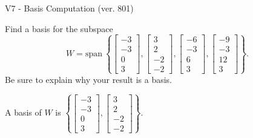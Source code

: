 \begin{exercise}
  \begin{exerciseTitle}V7 - Basis Computation (ver. 801)\end{exerciseTitle}
  \begin{exerciseStatement}
    Find a basis for the subspace 
\[W=\mathrm{span}\ \left\{\left[\begin{array}{r}
-3 \\
-3 \\
0 \\
3
\end{array}\right] , \left[\begin{array}{r}
3 \\
2 \\
-2 \\
-2
\end{array}\right] , \left[\begin{array}{r}
-6 \\
-3 \\
6 \\
3
\end{array}\right] , \left[\begin{array}{r}
-9 \\
-3 \\
12 \\
3
\end{array}\right]\right\}.\]
 Be sure to explain why your result is a basis.


  \end{exerciseStatement}
  \begin{exerciseAnswer}
   A basis of \(W\) is  \(\left\{\left[\begin{array}{r}
-3 \\
-3 \\
0 \\
3
\end{array}\right] , \left[\begin{array}{r}
3 \\
2 \\
-2 \\
-2
\end{array}\right]\right\}\).
  


  \end{exerciseAnswer}
\end{exercise}